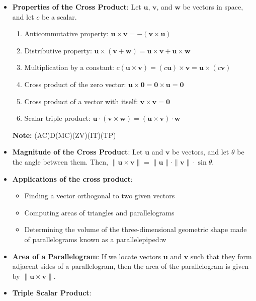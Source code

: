 \documentclass{report}
\begin{document}
\begin{itemize}
            \item \textbf{Properties of the Cross Product}:
                Let $\mathbf{u}$, $\mathbf{v}$, and $\mathbf{w}$ be vectors in space, and let $c$ be a scalar.
                \begin{enumerate}
                    \item Anticommutative property: $\mathbf{u} \times \mathbf{v} = -(\mathbf{v} \times \mathbf{u})$
                    \item Distributive property: $\mathbf{u} \times (\mathbf{v} + \mathbf{w}) = \mathbf{u} \times \mathbf{v} + \mathbf{u} \times \mathbf{w}$
                    \item Multiplication by a constant: $c(\mathbf{u} \times \mathbf{v}) = (c\mathbf{u}) \times \mathbf{v} = \mathbf{u} \times (c\mathbf{v})$
                    \item Cross product of the zero vector: $\mathbf{u} \times \mathbf{0} = \mathbf{0} \times \mathbf{u} = \mathbf{0}$
                    \item Cross product of a vector with itself: $\mathbf{v} \times \mathbf{v} = \mathbf{0}$
                    \item Scalar triple product: $\mathbf{u} \cdot (\mathbf{v} \times \mathbf{w}) = (\mathbf{u} \times \mathbf{v}) \cdot \mathbf{w}$
                \end{enumerate}
                \textbf{Note:} (AC)D(MC)(ZV)(IT)(TP)
            \item \textbf{Magnitude of the Cross Product}:
                Let $\mathbf{u}$ and $\mathbf{v}$ be vectors, and let $\theta$ be the angle between them. Then, $\|\mathbf{u} \times \mathbf{v}\| = \|\mathbf{u}\| \cdot \|\mathbf{v}\| \cdot \sin \theta.$
            \item \textbf{Applications of the cross product}:
            \begin{itemize}
                \item Finding a vector orthogonal to two given vectors
                \item Computing areas of triangles and parallelograms
                \item Determining the volume of the three-dimensional geometric shape made of parallelograms known as a parallelepiped:w

            \end{itemize}
        \item \textbf{Area of a Parallelogram}:
            If we locate vectors $\mathbf{u}$ and $\mathbf{v}$ such that they form adjacent sides of a parallelogram, then the area of the parallelogram is given by $\|\mathbf{u} \times \mathbf{v}\|$.
        \item \textbf{Triple Scalar Product}:


\end{itemize}
\end{document}
